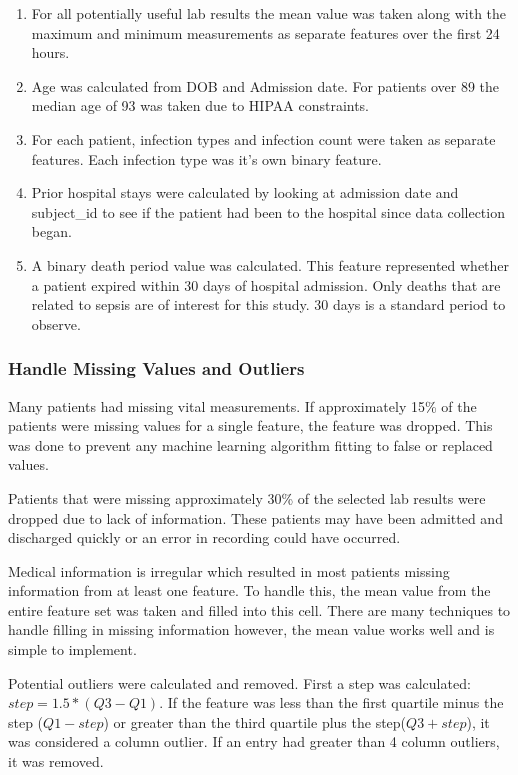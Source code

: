 \documentclass[11pt]{article}
\begin{document}
		\begin{enumerate}
			\item For all potentially useful lab results the mean value was taken along with the maximum and minimum measurements as separate features over the first 24 hours.
			\item Age was calculated from DOB and Admission date. For patients over 89 the median age of 93 was taken due to HIPAA constraints.
			\item For each patient, infection types and infection count were taken as separate features. Each infection type was it's own binary feature.
			\item Prior hospital stays were calculated by looking at admission date and subject\_id to see if the patient had been to the hospital since data collection began.
			\item A binary death period value was calculated. This feature represented whether a patient expired within 30 days of hospital admission. Only deaths that are related to sepsis are of interest for this study. 30 days is a standard period to observe.
		\end{enumerate}
	
		\subsubsection{Handle Missing Values and Outliers}
	
		Many patients had missing vital measurements. If approximately 15\% of the patients were missing values for a single feature, the feature was dropped. This was done to prevent any machine learning algorithm fitting to false or replaced values.
		
		Patients that were missing approximately 30\% of the selected lab results were dropped due to lack of information. These patients may have been admitted and discharged quickly or an error in recording could have occurred.
		
		Medical information is irregular which resulted in most patients missing information from at least one feature. To handle this, the mean value from the entire feature set was taken and filled into this cell. There are many techniques to handle filling in missing information however, the mean value works well and is simple to implement.
		
		Potential outliers were calculated and removed. First a step was calculated: \(step = 1.5*(Q3-Q1)\). If the feature was less than the first quartile minus the step (\(Q1 - step\)) or greater than the third quartile plus the step(\(Q3 + step\)), it was considered a column outlier. If an entry had greater than 4 column outliers, it was removed.
		
\end{document}
